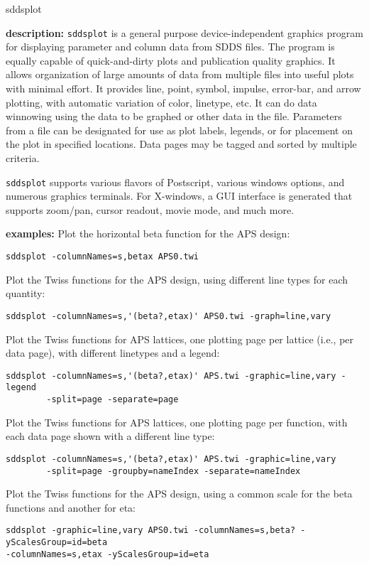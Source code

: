 \begin{sddsprog}{sddsplot}
  \item \textbf{description:}
    \verb|sddsplot| is a general purpose device-independent graphics program for displaying parameter and column data
from SDDS files.  The program is equally capable of quick-and-dirty plots and publication quality graphics.  It
allows organization of large amounts of data from multiple files into useful plots with minimal effort.  It
provides line, point, symbol, impulse, error-bar, and arrow plotting, with automatic variation of color, linetype,
etc.  It can do data winnowing using the data to be graphed or other data in the file.  Parameters from a file can
be designated for use as plot labels, legends, or for placement on the plot in specified locations.  Data pages may
be tagged and sorted by multiple criteria.

\verb|sddsplot| supports various flavors of Postscript, various windows options, and numerous graphics terminals.  For
X-windows, a GUI interface is generated that supports zoom/pan, cursor readout, movie mode, and much more.

  \item \textbf{examples:}
    Plot the horizontal beta function for the APS design:
    \begin{verbatim}
sddsplot -columnNames=s,betax APS0.twi
    \end{verbatim}
    Plot the Twiss functions for the APS design, using different line types for
    each quantity:
    \begin{verbatim}
sddsplot -columnNames=s,'(beta?,etax)' APS0.twi -graph=line,vary
    \end{verbatim}
    Plot the Twiss functions for APS lattices, one plotting page per lattice (i.e., per
    data page), with different linetypes and a legend:
    \begin{verbatim}
sddsplot -columnNames=s,'(beta?,etax)' APS.twi -graphic=line,vary -legend
        -split=page -separate=page
    \end{verbatim}
    Plot the Twiss functions for APS lattices, one plotting page per function, with each
    data page shown with a different line type:
    \begin{verbatim}
sddsplot -columnNames=s,'(beta?,etax)' APS.twi -graphic=line,vary
        -split=page -groupby=nameIndex -separate=nameIndex
    \end{verbatim}
    Plot the Twiss functions for the APS design, using a common scale for the beta functions
    and another for eta:
    \begin{verbatim}
sddsplot -graphic=line,vary APS0.twi -columnNames=s,beta? -yScalesGroup=id=beta
-columnNames=s,etax -yScalesGroup=id=eta
    \end{verbatim}


\end{sddsprog}
